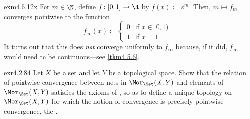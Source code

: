 \begin{exm}{}{exm4.5.12x}
For $m\in \N$, define $f\colon [0,1]\rightarrow \R$ by $f(x)\coloneqq x^m$.  Then, $m\mapsto f_m$ converges pointwise to the function
\begin{equation}
f_{\infty}(x)\coloneqq \begin{cases}0 & \text{if }x\in [0,1) \\ 1 & \text{if }x=1.\end{cases}
\end{equation}
It turns out that this does \emph{not} converge uniformly to $f_{\infty}$ because, if it did, $f_{\infty}$ would need to be continuous---see \cref{thm4.5.6}.
\end{exm}
\begin{exr}{}{exr4.2.84}
Let $X$ be a set and let $Y$ be a topological space.  Show that the relation of pointwise convergence between nets in $\Mor _{\Set}(X,Y)$ and elements of $\Mor _{\Set}(X,Y)$ satisfies the axioms of , so as to define a unique topology on $\Mor _{\Set}(X,Y)$ for which the notion of convergence is precisely pointwise convergence, the .
\end{exr}

